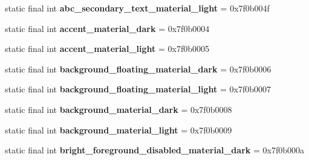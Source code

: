 \begin{DoxyCompactItemize}
\item 
\hypertarget{classandroid_1_1support_1_1design_1_1_r_1_1color_a5914b399b4295c431feb610f22a77aa6}{}static final int {\bfseries abc\+\_\+secondary\+\_\+text\+\_\+material\+\_\+light} = 0x7f0b004f\label{classandroid_1_1support_1_1design_1_1_r_1_1color_a5914b399b4295c431feb610f22a77aa6}

\item 
\hypertarget{classandroid_1_1support_1_1design_1_1_r_1_1color_ab01ada57244e9b90a9606f32bcbe6c24}{}static final int {\bfseries accent\+\_\+material\+\_\+dark} = 0x7f0b0004\label{classandroid_1_1support_1_1design_1_1_r_1_1color_ab01ada57244e9b90a9606f32bcbe6c24}

\item 
\hypertarget{classandroid_1_1support_1_1design_1_1_r_1_1color_a1d015d7a38834120bbb9174335ff1876}{}static final int {\bfseries accent\+\_\+material\+\_\+light} = 0x7f0b0005\label{classandroid_1_1support_1_1design_1_1_r_1_1color_a1d015d7a38834120bbb9174335ff1876}

\item 
\hypertarget{classandroid_1_1support_1_1design_1_1_r_1_1color_abeba2c742ff4f2955bd0790303e09814}{}static final int {\bfseries background\+\_\+floating\+\_\+material\+\_\+dark} = 0x7f0b0006\label{classandroid_1_1support_1_1design_1_1_r_1_1color_abeba2c742ff4f2955bd0790303e09814}

\item 
\hypertarget{classandroid_1_1support_1_1design_1_1_r_1_1color_a25b077b49863d0a2e9cfeb2a82bff372}{}static final int {\bfseries background\+\_\+floating\+\_\+material\+\_\+light} = 0x7f0b0007\label{classandroid_1_1support_1_1design_1_1_r_1_1color_a25b077b49863d0a2e9cfeb2a82bff372}

\item 
\hypertarget{classandroid_1_1support_1_1design_1_1_r_1_1color_a1c87383fdb42a238b779200d8b5d3cad}{}static final int {\bfseries background\+\_\+material\+\_\+dark} = 0x7f0b0008\label{classandroid_1_1support_1_1design_1_1_r_1_1color_a1c87383fdb42a238b779200d8b5d3cad}

\item 
\hypertarget{classandroid_1_1support_1_1design_1_1_r_1_1color_a50d50585c475903217d4d17e6838b04f}{}static final int {\bfseries background\+\_\+material\+\_\+light} = 0x7f0b0009\label{classandroid_1_1support_1_1design_1_1_r_1_1color_a50d50585c475903217d4d17e6838b04f}

\item 
\hypertarget{classandroid_1_1support_1_1design_1_1_r_1_1color_a0ea9074905ccfeecc3b032f952d0ea4e}{}static final int {\bfseries bright\+\_\+foreground\+\_\+disabled\+\_\+material\+\_\+dark} = 0x7f0b000a\label{classandroid_1_1support_1_1design_1_1_r_1_1color_a0ea9074905ccfeecc3b032f952d0ea4e}


\end{DoxyCompactItemize}
